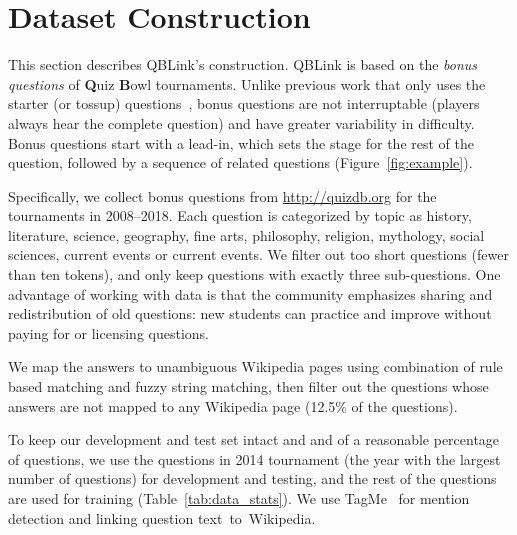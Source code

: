 \section{Dataset Construction}

This section describes QBLink's construction.
QBLink is based on the \textit{bonus questions} of
\textbf{Q}uiz \textbf{B}owl tournaments.  Unlike previous work that only uses the starter
(or tossup) questions~\cite{boydgraber2012Besting}, bonus questions are not
interruptable (players always hear the complete question) and have
greater variability in difficulty.  Bonus questions start with a
lead-in, which sets the stage for the rest of the question,
followed by a sequence of related questions (Figure~\ref{fig:example}).



Specifically, we collect bonus questions from \url{http://quizdb.org}
for the tournaments in 2008--2018.  Each question is categorized by
topic as history, literature, science, geography, fine arts,
philosophy, religion, mythology, social sciences, current events or
current events. We filter out too short questions (fewer than ten
tokens), and only keep questions with exactly three sub-questions.
One advantage of working with \qb{} data is that the community
emphasizes sharing and redistribution of old questions: new students
can practice and improve without paying for or licensing questions.



We map the answers to unambiguous Wikipedia pages using combination of
rule based matching and fuzzy string matching, then filter out the
questions whose answers are not mapped to any Wikipedia page (12.5\%
of the questions).

To keep our development and test set intact and
and of a reasonable percentage of questions,
we use the questions in 2014 tournament
(the year with the largest number
of questions) for
development and testing, and the rest of the questions are used for
training (Table~\ref{tab:data_stats}). We use
TagMe~\cite{ferragina2010tagme} for mention detection and linking
question text~to~Wikipedia.


